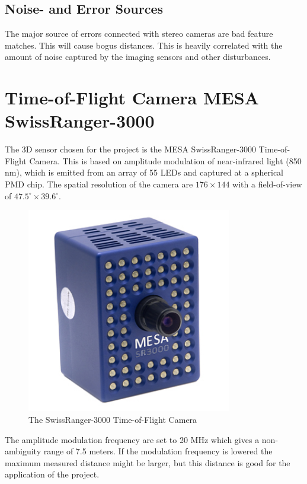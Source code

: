 \subsection{Noise- and Error Sources}
The major source of errors connected with stereo cameras are bad feature matches. This
will cause bogus distances. This is heavily correlated with the amount of noise captured
by the imaging sensors and other disturbances.




\section{Time-of-Flight Camera MESA SwissRanger-3000}
The 3D sensor chosen for the project is the MESA SwissRanger-3000 Time-of-Flight Camera.
This is based on amplitude modulation of near-infrared light (850 nm), which is emitted from an
array of 55 LEDs and captured at a spherical PMD chip. The spatial resolution of the camera
are $176\times144$ with a field-of-view of $47.5^\circ \times 39.6^\circ$. 
\begin{figure}[htbp]
    \centering
    \includegraphics[width=0.8\textwidth]{pics/sr3000}
    \caption{The SwissRanger-3000 Time-of-Flight Camera}
    \label{chap3:fig-sr3000}
\end{figure}
The amplitude modulation frequency are set to 20 MHz which gives a non-ambiguity range of
7.5 meters. If the modulation frequency is lowered the maximum measured distance might be
larger, but this distance is good for the application of the project.

